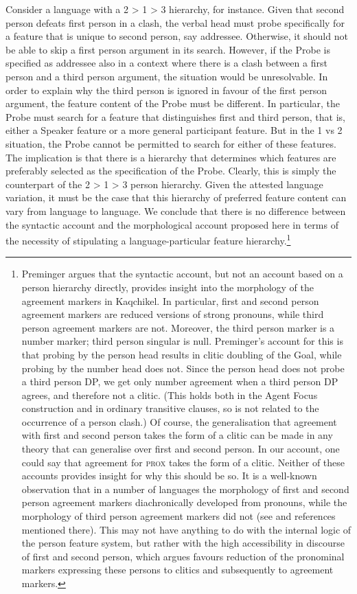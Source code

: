 \documentclass[output=paper]{langsci/langscibook}
\begin{document}
  Consider a language with a 2 > 1 > 3 hierarchy, for instance. Given that second person defeats first person in a clash, the verbal head must probe specifically for a feature that is unique to second person, say addressee. Otherwise, it should not be able to skip a first person argument in its search. However, if the Probe is specified as addressee also in a context where there is a clash between a first person and a third person argument, the situation would be unresolvable. In order to explain why the third person is ignored in favour of the first person argument, the feature content of the Probe must be different. In particular, the Probe must search for a feature that distinguishes first and third person, that is, either a Speaker feature or a more general participant feature. But in the 1 vs 2 situation, the Probe cannot be permitted to search for either of these features. The implication is that there is a hierarchy that determines which features are preferably selected as the specification of the Probe. Clearly, this is simply the counterpart of the 2 > 1 > 3 person hierarchy. Given the attested language variation, it must be the case that this hierarchy of preferred feature content can vary from language to language. We conclude that there is no difference between the syntactic account and the morphological account proposed here in terms of the necessity of stipulating a language-particular feature hierarchy.\footnote{Preminger argues that the syntactic account, but not an account based on a person hierarchy directly, provides insight into the morphology of the agreement markers in Kaqchikel. In particular, first and second person agreement markers are reduced versions of strong pronouns, while third person agreement markers are not. Moreover, the third person marker is a number marker; third person singular is null. Preminger’s account for this is that probing by the person head results in clitic doubling of the Goal, while probing by the number head does not. Since the person head does not probe a third person DP, we get only number agreement when a third person DP agrees, and therefore not a clitic. (This holds both in the Agent Focus construction and in ordinary transitive clauses, so is not related to the occurrence of a person clash.) Of course, the generalisation that agreement with first and second person takes the form of a clitic can be made in any theory that can generalise over first and second person. In our account, one could say that agreement for \textsc{prox} takes the form of a clitic. Neither of these accounts provides insight for why this should be so. It is a well-known observation that in a number of languages the morphology of first and second person agreement markers diachronically developed from pronouns, while the morphology of third person agreement markers did not (see \citealt{Fuß2005} and references mentioned there). This may not have anything to do with the internal logic of the person feature system, but rather with the high accessibility in discourse of first and second person, which \citet{Ariel2000} argues favours reduction of the pronominal markers expressing these persons to clitics and subsequently to agreement markers.}
\end{document}
